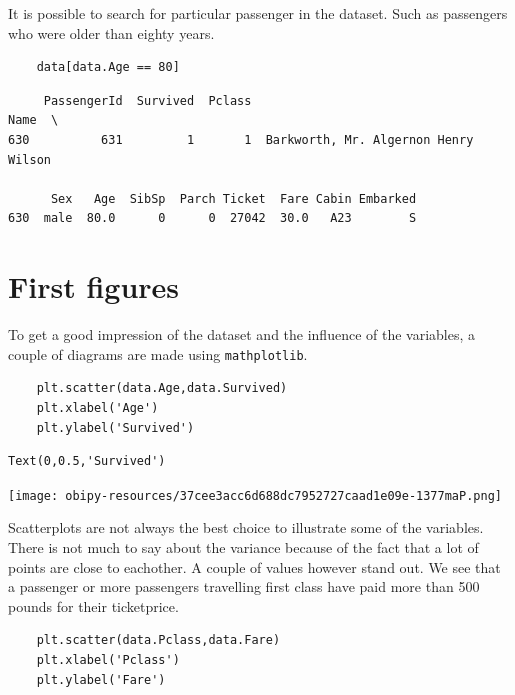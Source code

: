 \documentclass[11pt]{article}
\begin{document}
It is possible to search for particular passenger in the dataset. Such
as passengers who were older than eighty years.

\begin{verbatim}
    data[data.Age == 80]
\end{verbatim}

\begin{verbatim}
     PassengerId  Survived  Pclass                                  Name  \
630          631         1       1  Barkworth, Mr. Algernon Henry Wilson   

      Sex   Age  SibSp  Parch Ticket  Fare Cabin Embarked  
630  male  80.0      0      0  27042  30.0   A23        S  
\end{verbatim}

\section{First figures}
\label{first-figures}
To get a good impression of the dataset and the influence of the
variables, a couple of diagrams are made using \texttt{mathplotlib}.

\begin{verbatim}
    plt.scatter(data.Age,data.Survived)
    plt.xlabel('Age')
    plt.ylabel('Survived')
\end{verbatim}

\begin{verbatim}
Text(0,0.5,'Survived')
\end{verbatim}



\begin{center}
\texttt{[image: obipy-resources/37cee3acc6d688dc7952727caad1e09e-1377maP.png]}
\end{center}


Scatterplots are not always the best choice to illustrate some of the
variables. There is not much to say about the variance because of the
fact that a lot of points are close to eachother. A couple of values
however stand out. We see that a passenger or more passengers travelling
first class have paid more than 500 pounds for their ticketprice.

\begin{verbatim}
    plt.scatter(data.Pclass,data.Fare)
    plt.xlabel('Pclass')
    plt.ylabel('Fare')
\end{verbatim}
\end{document}
